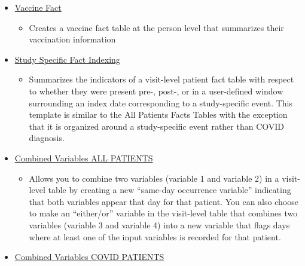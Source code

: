 \documentclass[
  letterpaper,
  DIV=11,
  numbers=noendperiod]{scrreprt}
\providecommand{\tightlist}{%
  \setlength{\itemsep}{0pt}\setlength{\parskip}{0pt}}\usepackage{longtable,booktabs,array}
\begin{document}
\begin{itemize}
\tightlist
\item
  \href{https://unite.nih.gov/workspace/module/view/latest/ri.workshop.main.module.3ab34203-d7f3-482e-adbd-f4113bfd1a2b?id=KO-4BE516B\&view=focus}{Vaccine
  Fact}

  \begin{itemize}
  \tightlist
  \item
    Creates a vaccine fact table at the person level that summarizes
    their vaccination information
  \end{itemize}
\item
  \href{https://unite.nih.gov/workspace/module/view/latest/ri.workshop.main.module.3ab34203-d7f3-482e-adbd-f4113bfd1a2b?id=KO-23CE9BD\&view=focus}{Study
  Specific Fact Indexing}

  \begin{itemize}
  \tightlist
  \item
    Summarizes the indicators of a visit-level patient fact table with
    respect to whether they were present pre-, post-, or in a
    user-defined window surrounding an index date corresponding to a
    study-specific event. This template is similar to the All Patients
    Facts Tables with the exception that it is organized around a
    study-specific event rather than COVID diagnosis.
  \end{itemize}
\item
  \href{https://unite.nih.gov/workspace/module/view/latest/ri.workshop.main.module.3ab34203-d7f3-482e-adbd-f4113bfd1a2b?id=KO-DE908D4\&view=focus}{Combined
  Variables ALL PATIENTS}

  \begin{itemize}
  \tightlist
  \item
    Allows you to combine two variables (variable 1 and variable 2) in a
    visit-level table by creating a new ``same-day occurrence variable''
    indicating that both variables appear that day for that patient. You
    can also choose to make an ``either/or'' variable in the visit-level
    table that combines two variables (variable 3 and variable 4) into a
    new variable that flags days where at least one of the input
    variables is recorded for that patient.
  \end{itemize}
\item
  \href{https://unite.nih.gov/workspace/module/view/latest/ri.workshop.main.module.3ab34203-d7f3-482e-adbd-f4113bfd1a2b?id=KO-DA00725\&view=focus}{Combined
  Variables COVID PATIENTS}


\end{itemize}
\end{document}
